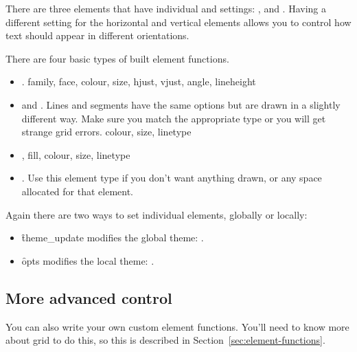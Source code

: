 There are three elements that have individual  and  settings: ,  and .  Having a different setting for the horizontal and vertical elements allows you to control how text should appear in different orientations.

There are four basic types of built element functions.

\begin{itemize}
  \item {}. family, face, colour, size, hjust, vjust, angle, lineheight

  \item {} and .  Lines and segments have the same options but are drawn in a slightly different way.  Make sure you match the appropriate type or you will get strange grid errors.  colour, size, linetype

  \item {}, fill, colour, size, linetype

  \item {}.  Use this element type if you don't want anything drawn, or any space allocated for that element.  

\end{itemize}

Again there are two ways to set individual elements, globally or locally:

\begin{itemize}
  \item \f{theme_update} modifies the global theme: .
  
  \item \f{opts} modifies the local theme: .
  
\end{itemize}

% 
% 

\subsection{More advanced control}
\label{sub:more_advanced_control}

You can also write your own custom element functions.  You'll need to know more about grid to do this, so this is described in Section~\ref{sec:element-functions}.

